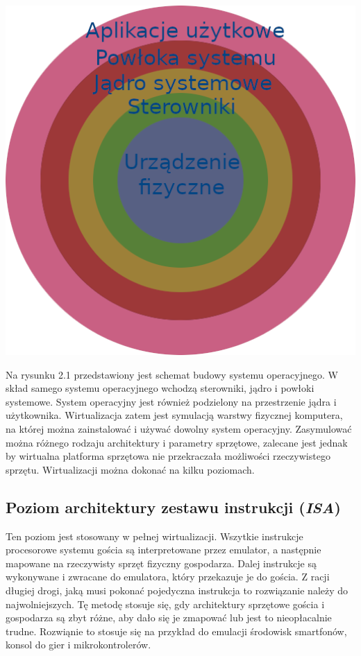 \documentclass[polish, a4paper, 12pt, oneside]{book}
\begin{document}
\begin{center}
\includegraphics[width=160mm]{schemat_os.png}
\end{center}

Na rysunku 2.1 przedstawiony jest schemat budowy systemu operacyjnego. W skład samego systemu operacyjnego wchodzą sterowniki, jądro i powłoki systemowe. System operacyjny jest również podzielony na przestrzenie jądra i użytkownika. Wirtualizacja zatem jest symulacją warstwy fizycznej komputera, na której można zainstalować i używać dowolny system operacyjny. Zasymulować można różnego rodzaju architektury i parametry sprzętowe, zalecane jest jednak by wirtualna platforma sprzętowa nie przekraczała możliwości rzeczywistego sprzętu. Wirtualizacji można dokonać na kilku poziomach. 
\subsection {Poziom architektury zestawu instrukcji (\textit{ISA})}
Ten poziom jest stosowany w pełnej wirtualizacji. Wszytkie instrukcje procesorowe systemu gościa są interpretowane przez emulator, a następnie mapowane na rzeczywisty sprzęt fizyczny gospodarza. Dalej instrukcje są wykonywane i zwracane do emulatora, który przekazuje je do gościa. Z racji długiej drogi, jaką musi pokonać pojedyczna instrukcja to rozwiązanie należy do najwolniejszych. Tę metodę stosuje się, gdy architektury sprzętowe gościa i gospodarza są zbyt różne, aby dało się je zmapować lub jest to nieopłacalnie trudne. Rozwiąnie to stosuje się na przykład do emulacji środowisk smartfonów, konsol do gier i mikrokontrolerów.
\end{document}
